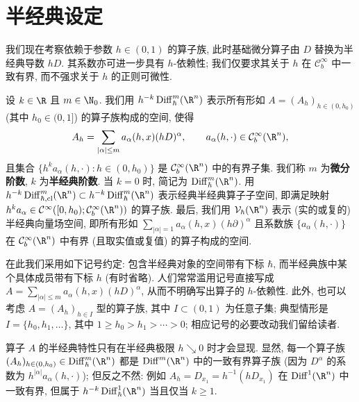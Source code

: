 \section{半经典设定}\label{sec:2.6}
%
%

我们现在考察依赖于参数 $h \in (0, 1)$ 的算子族, 此时基础微分算子由 $D$ 替换为半经典导数 $h D$. 其系数亦可进一步具有 $h$-依赖性; 我们仅要求其关于 $h$ 在 $\mathcal{C}_b^\infty$ 中一致有界, 而不强求关于 $h$ 的正则可微性.

\begin{definition}[半经典微分算子]\label{def:2.23}
设 $k \in \R$ 且 $m \in \N_0$. 我们用 $h^{-k} \Diff_\hbar^m(\R^n)$ 表示所有形如 $A = (A_h)_{h \in (0, h_0)}$ (其中 $h_0 \in (0, 1]$) 的算子族构成的空间, 使得
\begin{equation}\label{eq:2.59}
    A_h = \sum_{|\alpha| \le m} a_\alpha(h, x) (h D)^\alpha, \qquad a_\alpha(h, \cdot) \in \mathcal{C}_b^\infty(\R^n),
\end{equation}
且集合 $\{ h^k a_\alpha(h, \cdot) : h \in (0, h_0) \}$ 是 $\mathcal{C}_b^\infty(\R^n)$ 中的有界子集. 我们称 $m$ 为\textbf{微分阶数}, $k$ 为\textbf{半经典阶数}. 当 $k = 0$ 时, 简记为 $\Diff_\hbar^m(\R^n)$. 用 $h^{-k} \Diff_{\hbar, \mathrm{cl}}^m(\R^n) \subset h^{-k} \Diff_\hbar^m(\R^n)$ 表示经典半经典算子子空间, 即满足映射 $h^k a_\alpha \in \mathcal{C}^\infty([0, h_0); \mathcal{C}_b^\infty(\R^n))$ 的算子族. 最后, 我们用 $\mathcal{V}_\hbar(\R^n)$ 表示 (实的或复的) 半经典向量场空间, 即所有形如 $\sum_{|\alpha| = 1} a_\alpha(h, x) (h \partial)^\alpha$ 且系数族 $\{a_\alpha(h, \cdot)\}$ 在 $\mathcal{C}_b^\infty(\R^n)$ 中有界 (且取实值或复值) 的算子构成的空间.
\end{definition}

在此我们采用如下记号约定: 包含半经典对象的空间带有下标 $\hbar$, 而半经典族中某个具体成员带有下标 $h$ (有时省略). 人们常常滥用记号直接写成 $A = \sum_{|\alpha| \le m} a_\alpha(h, x) (h D)^\alpha$, 从而不明确写出算子的 $h$-依赖性. 此外, 也可以考虑 $A = (A_h)_{h \in I}$ 型的算子族, 其中 $I \subset (0, 1)$ 为任意子集; 典型情形是 $I = \{h_0, h_1, \ldots\}$, 其中 $1 \ge h_0 > h_1 > \cdots > 0$; 相应记号的必要改动我们留给读者.

算子 $A$ 的半经典特性只有在半经典极限 $h \searrow 0$ 时才会显现. 显然, 每一个算子族 $(A_h)_{h \in (0, h_0)} \in \Diff_\hbar^m(\R^n)$ 都是 $\Diff^m(\R^n)$ 中的一致有界算子族 (因为 $D^\alpha$ 的系数为 $h^{|\alpha|} a_\alpha(h, \cdot)$); 但反之不然: 例如 $A_h = D_{x_1} = h^{-1} (h D_{x_1})$ 在 $\Diff^1(\R^n)$ 中一致有界, 但属于 $h^{-k} \Diff_\hbar^1(\R^n)$ 当且仅当 $k \ge 1$.

